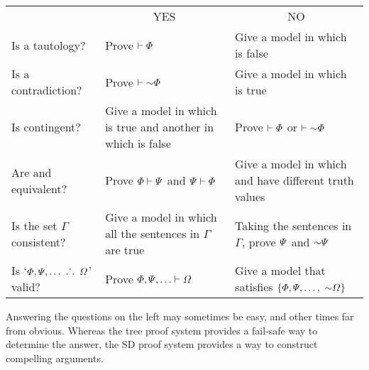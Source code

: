 \begin{table}[h]
\begin{center}
\begin{tabular*}{\textwidth}{p{12em}|p{10em}|p{12em}|}
\cline{2-3}

 & \multicolumn{1}{|c|}{YES} & \multicolumn{1}{|c|}{NO}\\
\cline{2-3}

Is \metaA{} a tautology? & Prove $\vdash\varPhi{}$ & Give a model in which \metaA{} is false\\
\cline{2-3}

Is \metaA{} a contradiction? &  Prove $\proves\enot\metaA{}$ & Give a model in which \metaA{} is true\\
\cline{2-3}

Is \metaA{} contingent? & Give a model in which \metaA{} is true and another in which \metaA{} is false & Prove $\vdash\varPhi{}$ or $\proves\enot\metaA{}$\\
\cline{2-3}

Are \metaA{} and \metaB{} equivalent? & Prove \mbox{$\varPhi{}\vdash\varPsi{}$} and \mbox{$\varPsi{}\vdash\varPhi{}$}  & Give a model in which \metaA{} and \metaB{} have different truth values\\
\cline{2-3}

Is the set $\Gamma$ consistent? & Give a model in which all the sentences in $\Gamma$ are true & Taking the sentences in $\Gamma$, prove $\varPsi$ and $\enot\metaB$\\
\cline{2-3}

Is `$\varPhi, \varPsi, \ldots\ \ldotp\dot{}\,\ldotp\ \varOmega$' valid? & Prove $\varPhi{}, \varPsi{}, \ldots \vdash\varOmega{}$ & Give a model that satisfies $\set{\metaA, \metaB, \ldots,\ \enot \metaC}$\\
\cline{2-3}
\end{tabular*}
\end{center}
\label{table.ProofOrModel}
\end{table}

Answering the questions on the left may sometimes be easy, and other times far from obvious.
Whereas the tree proof system provides a fail-safe way to determine the answer, the SD proof system provides a way to construct compelling arguments.





